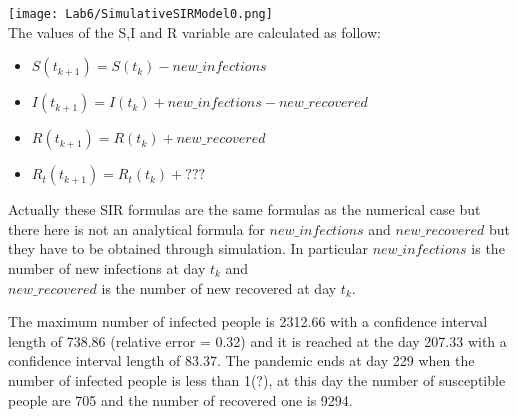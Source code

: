 \documentclass{report}
\begin{document}
{					
	 						\texttt{[image: Lab6/SimulativeSIRModel0.png]} \\
								The values of the S,I and R variable are calculated as follow:
								\begin{itemize}
								  \item[] \hspace{5cm} $S(t_{k+1}) = S(t_{k}) - new\_infections$
									\item[] \hspace{5cm} $I(t_{k+1}) = I(t_{k}) + new\_infections - new\_recovered$
									\item[] \hspace{5cm} $R(t_{k+1}) = R(t_{k}) + new\_recovered$
									\item[] \hspace{5cm} $R_t(t_{k+1}) = R_t(t_{k}) + ???$
			 					\end{itemize}
			 Actually these SIR formulas are the same formulas as the numerical case but there here is not an analytical formula for $new\_infections$ and $new\_recovered$ but they have to be obtained through simulation.
			 In particular $new\_infections$ is the number of new infections at day $t_k$ and \\
			  $new\_recovered$ is the number of new recovered at day  $t_k$.
			  								
			The maximum number of infected people is 2312.66 with a confidence interval length of 738.86 (relative error = 0.32) and it is reached at the day 207.33 with a confidence interval length of 83.37. The pandemic ends at day 229 when the number of infected people is less than 1(?), at this day the number of susceptible people are 705 and the number of recovered one is 9294.
			 
			 
} \fi
\end{document}
